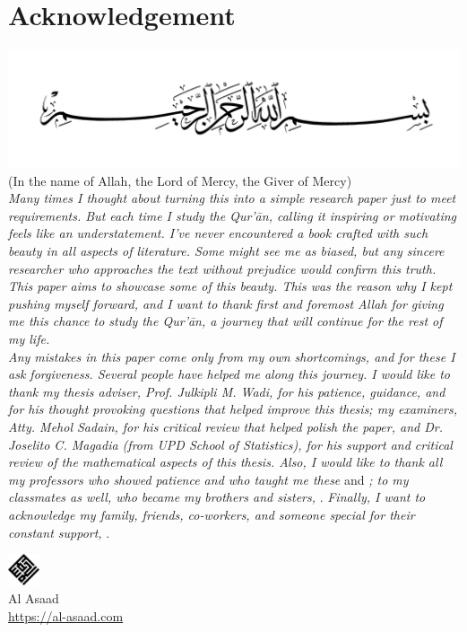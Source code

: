 \chapter*{Acknowledgement}
{\centering
\includegraphics[scale = 0.7]{img/bismillah.jpg}\\[-.4cm]
(In the name of Allah, the Lord of Mercy, the Giver of Mercy)\\[0.6cm]
}\textit{Many times I thought about turning this into a simple research paper just to meet requirements. But each time I study the Qur'\=an, calling it inspiring or motivating feels like an understatement. I've never encountered a book crafted with such beauty in all aspects of literature. Some might see me as biased, but any sincere researcher who approaches the text without prejudice would confirm this truth. This paper aims to showcase some of this beauty. This was the reason why I kept pushing myself forward, and I want to thank first and foremost Allah \textrm{} for giving me this chance to study the Qur'\=an, a journey that will continue for the rest of my life.}\\[0.3cm]
\indent\textit{Any mistakes in this paper come only from my own shortcomings, and for these I ask forgiveness. Several people have helped me along this journey. I would like to thank my thesis adviser, Prof. Julkipli M. Wadi, for his patience, guidance, and for his thought provoking questions that helped improve this thesis; my examiners, Atty. Mehol Sadain, for his critical review that helped polish the paper, and Dr. Joselito C. Magadia (from UPD School of Statistics), for his support and critical review of the mathematical aspects of this thesis. Also, I would like to thank all my professors who showed patience and who taught me these}  and \textit{; to my classmates as well, who became my brothers and sisters,} . \textit{Finally, I want to acknowledge my family, friends, co-workers, and someone special for their constant support,} .\\[0.4cm]
\begin{center}
    \includegraphics[width=0.07\textwidth]{img/alasaad-logo.png}\\
    Al Asaad\\
    \url{https://al-asaad.com}\\[-0.5cm]
\end{center}
